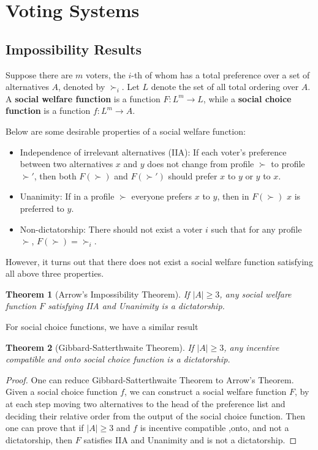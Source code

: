 \documentclass[openany]{book}
\newtheorem{theorem}{Theorem}[chapter]
\theoremstyle{remark}
\begin{document}
\section{Voting Systems}
\subsection{Impossibility Results}
Suppose there are $m$ voters, the $i$-th of whom has a total preference over a set of alternatives $A$, denoted by $\succ_i$. Let $L$ denote the set of all total ordering over $A$. A \textbf{social welfare function} is a function $F:L^m\to L$, while a \textbf{social choice function} is a function $f:L^m\to A$.

Below are some desirable properties of a social welfare function:
\begin{itemize}
    \item Independence of irrelevant alternatives (IIA): If each voter's preference between two alternatives $x$ and $y$ does not change from profile $\succ$ to profile $\succ'$, then both $F(\succ)$ and $F(\succ')$ should prefer $x$ to $y$ or $y$ to $x$.
    \item Unanimity: If in a profile $\succ$ everyone prefers $x$ to $y$, then in $F(\succ)$ $x$ is preferred to $y$.
    \item Non-dictatorship: There should not exist a voter $i$ such that for any profile $\succ$, $F(\succ)=\succ_i$.
\end{itemize}

However, it turns out that there does not exist a social welfare function satisfying all above three properties.
\begin{theorem}[Arrow's Impossibility Theorem]
    If $|A|\ge3$, any social welfare function $F$ satisfying IIA and Unanimity is a dictatorship.
\end{theorem}

For social choice functions, we have a similar result
\begin{theorem}[Gibbard-Satterthwaite Theorem]
    If $|A|\ge3$, any incentive compatible and onto social choice function is a dictatorship.
\end{theorem}
\begin{proof}
    One can reduce Gibbard-Satterthwaite Theorem to Arrow's Theorem. Given a social choice function $f$, we can construct a social welfare function $F$, by at each step moving two alternatives to the head of the preference list and deciding their relative order from the output of the social choice function. Then one can prove that if $|A|\ge3$ and $f$ is incentive compatible ,onto, and not a dictatorship, then $F$ satisfies IIA and Unanimity and is not a dictatorship.
\end{proof}
\end{document}
